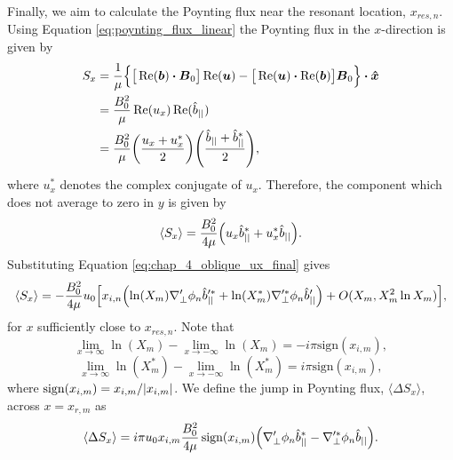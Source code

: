 Finally, we aim to calculate the Poynting flux near the resonant location, $x_{res,n}$. Using Equation \eqref{eq:poynting_flux_linear} the Poynting flux in the $x$-direction is given by
\begin{equation}
\begin{aligned}
    S_x &= \frac{1}{\mu}\Big\{\big[\Re(\vec{b})\vdot\vec{B}_0\big]\Re(\vec{u}) - \big[\Re(\vec{u})\vdot\Re(\vec{b})\big]\vec{B}_0\Big\}\vdot\vec{\hat{x}} \\
    &= \frac{B_0^2}{\mu}\Re(u_x)\Re(\hat{b}_{||}) \\
    &= \frac{B_0^2}{\mu}\qty(\frac{u_x + u_x^*}{2})\qty(\frac{\hat{b}_{||}+\hat{b}_{||}^*}{2}),
\end{aligned}
\end{equation}
where $u_x^*$ denotes the complex conjugate of $u_x$. Therefore, the component which does not average to zero in $y$ is given by
\begin{equation}
    \langle S_x \rangle = \frac{B_0^2}{4\mu}\qty(u_x\hat{b}_{||}^* + u_x^*\hat{b}_{||}).
\end{equation}
Substituting Equation \eqref{eq:chap_4_oblique_ux_final} gives
\begin{equation}
    \label{eq:oblique_field_poy_flux_ana}
    \langle S_x \rangle = -\frac{B_0^2}{4\mu}u_0\qty[x_{i,n}\qty(\ln(X_m)\nabla_\perp'\phi_n\hat{b}_{||}'^* + \ln(X_m^*)\nabla_\perp'^*\phi_n\hat{b}_{||}') + O(X_m, X_m^2\ln X_m)],
\end{equation}
for $x$ sufficiently close to $x_{res,n}$.
Note that
\[\lim_{x\rightarrow \infty} \ln(X_m) - \lim_{x\rightarrow -\infty} \ln(X_m) = -i\pi\text{sign}(x_{i,m}),\]
\[\lim_{x\rightarrow \infty} \ln(X_m^*) - \lim_{x\rightarrow -\infty} \ln(X_m^*) = i\pi\text{sign}(x_{i,m}),\]
where $\text{sign}(x_{i,m})=x_{i,m}/\abs{x_{i,m}}$.
We define the jump in Poynting flux, $\langle \Delta S_x \rangle$, across $x=x_{r,m}$ as
\begin{equation}
    \label{eq:chap_4_jump_in_poy_flux}
    \langle \Delta S_x \rangle = i\pi u_0x_{i,m}\frac{B_0^2}{4\mu}\, \text{sign}(x_{i,m})\qty(\nabla_\perp'\phi_n \hat{b}_{||}^* - \nabla_\perp'^*\phi_n \hat{b}_{||}).
\end{equation}

